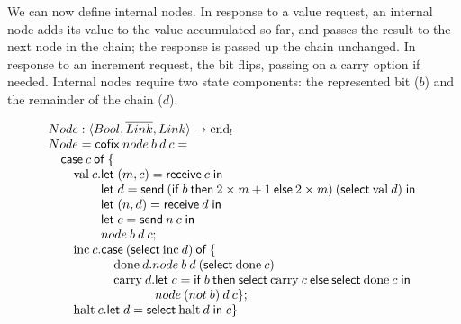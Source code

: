 \documentclass[orivec,envcountsame]{llncs}
\makeatletter
\newcommand{\gvdual}[1]{\overline{#1}}
\newcommand{\uto}{\ensuremath{\rightarrow}}
\newcommand{\outterm}{\mathrm{end}_!}
\newcommand{\mkwd}[1]{\mathsf{#1}}
\newcommand{\clabel}[1]{\mathrm{#1}}
\newcommand{\sel}[2]{#1[\clabel{#2}]}
\newcommand{\gvsend}[2]{\mkwd{send}\:#1\:#2}
\newcommand{\gvreceive}[1]{\mkwd{receive}\:#1}
\newcommand{\gvlet}[3]{\mkwd{let}\;#1 = #2\;\mkwd{in}\;#3}
\newcommand{\gvselect}[2]{\mkwd{select}\:#1\:#2}
\newcommand{\lrkwd}{\mkwd{cofix}}
\newcommand{\ba}{\begin{array}}
\newcommand{\ea}{\end{array}}
\newcommand{\bl}{\ba[t]{@{}l@{}}}
\newcommand{\el}{\ea}
\makeatother
\begin{document}
%
%
We can now define internal nodes. In response to a value request, an internal node adds its value to
the value accumulated so far, and passes the result to the next node in the chain; the response is
passed up the chain unchanged. In response to an increment request, the bit flips, passing on a
carry option if needed. Internal nodes require two state components: the represented bit ($b$) and
the remainder of the chain ($d$).
%
\newcommand{\gvifthen}[3]{\mkwd{if}\:#1\:\mkwd{then}\:#2\:\mkwd{else}\:#3}
%

\[
\bl
Node : \langle Bool, \gvdual{Link}, Link \rangle \uto \outterm \\
Node = \lrkwd\:node\:b\:d\:c = \\
\quad
  \bl
  \mkwd{case}\:c\:\mkwd{of}\:\{ \\
    \quad
      \bl
      \clabel{val}\:c.
        \bl
        \gvlet{(m,c)}{\gvreceive{c}}{} \\
        \gvlet{d}{\gvsend{(\gvifthen{b}{2 \times m + 1}{2 \times m})}{(\gvselect{\clabel{val}}{d})}}{} \\
        \gvlet{(n,d)}{\gvreceive{d}}{} \\
        \gvlet{c}{\gvsend{n}{c}}{} \\
        node\:b\:d\:c; \\
        \el \\
      \clabel{inc}\:c.
        \bl
        \mkwd{case}\:(\gvselect{\clabel{inc}}{d})\:\mkwd{of}\:\{ \\
        \quad
          \bl
          \clabel{done}\:d. node\:b\:d\:(\gvselect{\clabel{done}}{c}) \\
          \clabel{carry}\:d.
            \bl
            \gvlet{c}{\gvifthen{b}{\gvselect{\clabel{carry}}{c}}{\gvselect{\clabel{done}}{c}}}{} \\
            node\:(not\:b)\:d\:c \}; \\
            \el \\
          \el \\
        \el \\
      \clabel{halt}\:c. \gvlet{d}{\gvselect{\clabel{halt}}{d}}{c} \} \\
      \el \\
  \el \\
\el
\]
\end{document}
